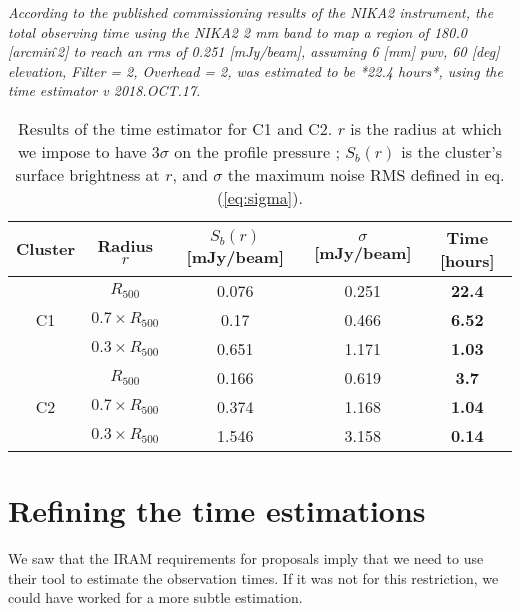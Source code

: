 \documentclass[11pt]{article}
\newcommand{\fh}{_{500}}
\begin{document}
\vspace{15pt}
\begin{minipage}{0.9\textwidth}
    \textit{According to the published commissioning results of the NIKA2 instrument, the total observing time using the NIKA2 2 mm band to map a region of 180.0 [arcmin\^\,2] to reach an rms of 0.251 [mJy/beam], assuming 6 [mm] pwv, 60 [deg] elevation, Filter = 2, Overhead = 2, was estimated to be *22.4 hours*, using the time estimator v 2018.OCT.17.}
\end{minipage}
\vspace{15pt}

\begin{table}[ht]
    \centering
    \begin{tabular}{c c c c c}
        \toprule
        Cluster  &  Radius $r$  &  $S_b(r)$ [mJy/beam]  &  $\sigma$ [mJy/beam]  &  \textbf{Time [hours]} \\
        \midrule\midrule
        \multirow{3}{60pt}{\centering C1}  &  $R\fh$  &  0.076  &  0.251 &  \textbf{22.4}\\
            &  $0.7\times R\fh$  &  0.17  & 0.466 & \textbf{6.52} \\
            &  $0.3\times R\fh$  &  0.651 & 1.171 & \textbf{1.03} \\
        \midrule
        \multirow{3}{60pt}{\centering C2}  &  $R\fh$  &  0.166 & 0.619 & \textbf{3.7} \\
            &  $0.7\times R\fh$  &  0.374 & 1.168 & \textbf{1.04} \\
            &  $0.3\times R\fh$  &  1.546 & 3.158 & \textbf{0.14} \\
        \bottomrule
    \end{tabular}
    \caption{Results of the time estimator for C1 and C2. $r$ is the radius at which we impose to have $3\sigma$ on the profile pressure ; $S_b(r)$ is the cluster's surface brightness at $r$, and $\sigma$ the maximum noise RMS defined in eq. (\ref{eq:sigma}).}
    \label{tab:results}
\end{table}

\section{Refining the time estimations}

We saw that the IRAM requirements for proposals imply that we need to use their tool to estimate the observation times.
If it was not for this restriction, we could have worked for a more subtle estimation.
\end{document}
